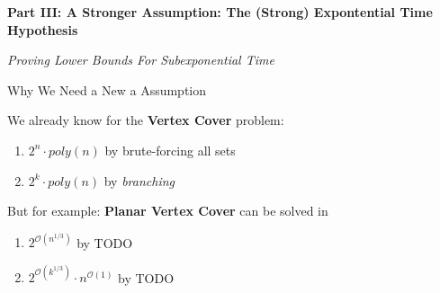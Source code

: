 \begin{frame}[c]{}
\begin{center}
    \textbf{Part III: A Stronger Assumption: The (Strong) Expontential Time Hypothesis}
    
    \textit{Proving Lower Bounds For Subexponential Time}
\end{center}
\end{frame}


\begin{frame}[c]{Why We Need a New a Assumption}

\begin{center}
We already know for the \textbf{Vertex Cover} problem:

\begin{enumerate}
    \pause\item $2^n \cdot poly(n)$ by brute-forcing all sets
    \pause\item $2^k \cdot poly(n)$ by \textit{branching}
\end{enumerate}

But for example: \textbf{Planar Vertex Cover} can be solved in 
\begin{enumerate}
    \pause\item $2^{\mathcal{O}(n^{1/3})}$ by TODO
    \pause\item $2^{\mathcal{O}(k^{1/3})} \cdot n^{\mathcal{O}(1)} $ by TODO
\end{enumerate}
\end{center}

\end{frame}
